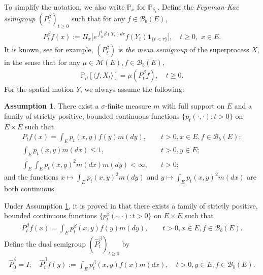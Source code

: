 \documentclass[12pt,a4paper]{amsart}
\theoremstyle{plain}
\theoremstyle{definition}
\newtheorem{asp}{Assumption}
\numberwithin{equation}{section}
\begin{document}
To simplify the notation, we also write $\mathbb P_x$ for $\mathbb
P_{\delta_x}$. Define the \emph{Feynman-Kac semigroup} $(P^\beta_t)_{t\geq 0}$
such that for any $ f\in \mathcal B_b(E)$,
\begin{align}
	P^\beta_tf(x)
	:= \Pi_x \big[e^{\int_0^{t} \beta(Y_r)dr} f(Y_t)\mathbf 1_{\{t<\tau\}}\big],
	\quad t\geq 0,\,\, x\in E.
\end{align}
It is known, see \cite[Proposition 2.27]{Li2011Measure-valued} for example,
$(P^\beta_t)$ is \emph{the mean semigroup} of the superprocess $X$, in the sense
that for any $\mu \in \mathcal M(E),f \in \mathcal B_b(E)$,
\begin{align} \label{eq: Ygalom type result without 2rd moment} \mathbb P_\mu
  [\langle f,X_t\rangle] = \mu(P^\beta_t f), \quad t \geq 0.
\end{align}
For the spatial motion $Y$, we always assume the following:
\begin{asp}
\label{asp: 1}
There exist a $\sigma$-finite measure $m$ with full support on $E$ and a family
of strictly positive, bounded continuous functions $\{ p_t(\cdot,\cdot): t > 0
\}$ on $E \times E$ such that
\begin{align}
  	P_tf(x)
  	= \int_E p_t(x,y) f(y) m(dy),
  	&\quad t>0, x \in E,f \in \mathcal B_b(E);
  	\\ \int_E p_t(x,y)m(dx)\leq 1, &\quad t>0,y\in E;
  	\\ \int_E \int_E p_t(x,y)^2 m(dx) m(dy)
  	<\infty,
  	&\quad t> 0;
\end{align}
and the functions $x \mapsto \int_E p_t(x,y)^2 m(dy)$ and $y \mapsto \int_E
p_t(x,y)^2 m(dx)$ are both continuous.
\end{asp}
Under Assumption \ref{asp: 1}, it is proved in
\cite{RenSongZhang2015Limit,RenSongZhang2017Central} that there exists a family
of strictly positive, bounded continuous functions $\{ p^\beta_t(\cdot,\cdot): t
> 0 \}$ on $E \times E$ such that
\begin{align}
	P^\beta_t f(x)
	= \int_E p_t^\beta (x,y) f(y) m(dy),
	\quad \quad t>0, x \in E,f \in \mathcal B_b(E).
\end{align}
Define the dual semigroup $(\widehat P^{\beta}_t)_{t \geq 0}$ by
\begin{align}
	\widehat P^{\beta}_0 = I;
	\quad \widehat P^{\beta}_t f(y)
	:= \int_E p^\beta_t (x,y) f(x) m(dx),
	\quad t>0, y\in E, f\in \mathcal B_b(E).
\end{align}
\end{document}
